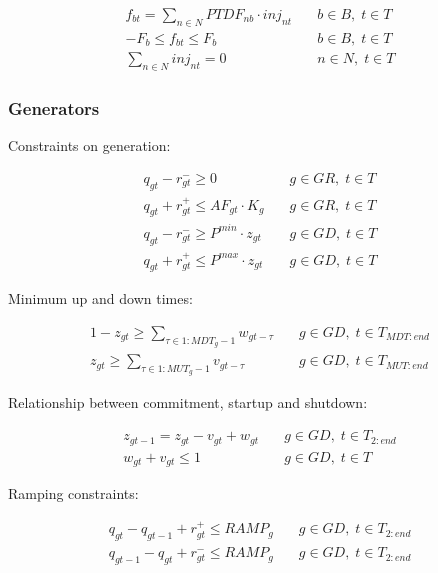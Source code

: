 \documentclass[number,times]{elsarticle}
\begin{document}
\begin{align}
    f_{bt} = \sum_{n \in N} PTDF_{nb} \cdot inj_{nt} & \quad b \in B, \; t \in T \\
    -F_b \leq f_{bt} \leq F_b                        & \quad b \in B, \; t \in T \\
    \sum_{n \in N} inj_{nt} = 0                      & \quad n \in N, \; t \in T
\end{align}

\subsubsection{Generators}

Constraints on generation:

\begin{align}
    q_{gt} - r^{-}_{gt} \geq 0                    & \quad g \in GR, \; t \in T \\
    q_{gt} + r^{+}_{gt} \leq AF_{gt} \cdot K_g    & \quad g \in GR, \; t \in T \\
    q_{gt} - r^{-}_{gt} \geq P^{min} \cdot z_{gt} & \quad g \in GD, \; t \in T \\
    q_{gt} + r^{+}_{gt} \leq P^{max} \cdot z_{gt} & \quad g \in GD, \; t \in T
\end{align}

Minimum up and down times:

\begin{align}
    1 - z_{gt} \geq \sum_{\tau \in 1:MDT_g - 1} w_{gt-\tau} & \quad g \in GD, \; t \in T_{MDT:end} \\
    z_{gt} \geq \sum_{\tau \in 1:MUT_g - 1} v_{gt-\tau}     & \quad g \in GD, \; t \in T_{MUT:end}
\end{align}

Relationship between commitment, startup and shutdown:

\begin{align}
    z_{gt-1} = z_{gt} - v_{gt} + w_{gt} & \quad g \in GD, \; t \in T_{2:end} \\
    w_{gt} + v_{gt} \leq 1              & \quad g \in GD, \; t \in T
\end{align}

Ramping constraints:

\begin{align}
    q_{gt} - q_{gt-1} + r^+_{gt} \leq RAMP_g & \quad g \in GD, \; t \in T_{2:end} \\
    q_{gt-1} - q_{gt} + r^-_{gt} \leq RAMP_g & \quad g \in GD, \; t \in T_{2:end}
\end{align}
\end{document}
